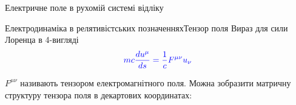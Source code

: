 \documentclass[9pt]{beamer}
\begin{document}
\begin{frame}{Електричне поле в рухомій системі відліку}{}
\begin{center}
\begin{pict}
		\end{pict}
	\end{center}

\end{frame}




\begin{frame}{Електродинаміка в релятивістських позначеннях}{Тензор поля}\small
Вираз для сили Лоренца в 4-вигляді
\begin{equation*}\color{blue}
	mc\frac{du^{\mu}}{ds} = \frac1c F^{\mu\nu}u_{\nu}
\end{equation*}

$ F^{\mu\nu} $ називають тензором електромагнітного поля. Можна зобразити матричну структуру тензора поля в декартових координатах:


\end{frame}
\end{document}
